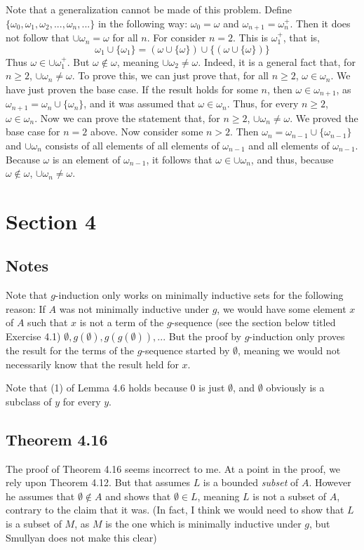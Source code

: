 \documentclass{article}
\theoremstyle{definition}
\begin{document}
Note that a generalization cannot be made of this problem. Define $\{\omega_0,\omega_1,\omega_2,...,\omega_n,...\}$ in the following way: $\omega_0=\omega$ and 
$\omega_{n+1}=\omega_n^+$. Then it does not follow that $\cup\omega_n=\omega$ for all $n$. For consider $n=2$. This is $\omega_1^+$, that is, 
\[ \omega_1\cup\{\omega_1\}=(\omega\cup\{\omega\})\cup\{(\omega\cup\{\omega\})\} \] Thus $\omega\in\cup\omega_1^+$. But $\omega\notin\omega$, meaning 
$\cup\omega_2\ne\omega$. Indeed, it is a general fact that, for $n\ge 2$, $\cup\omega_n\ne\omega$. To prove this, we can just prove that, for all $n\ge 2$, 
$\omega\in\omega_n$. We have just proven the base case. If the result holds for some $n$, then $\omega\in\omega_{n+1}$, as $\omega_{n+1}=\omega_n \cup\{\omega_n\}$, and it was assumed that 
$\omega\in\omega_n$. Thus, for every $n\ge 2$, $\omega\in\omega_n$. Now we can prove the statement that, for $n\ge 2$, $\cup\omega_n\ne\omega$. We proved the base case for $n=2$ above. 
Now consider some $n>2$. Then $\omega_n=\omega_{n-1}\cup\{\omega_{n-1}\}$ and $\cup\omega_n$ consists of all elements of all elements of $\omega_{n-1}$ and 
all elements of $\omega_{n-1}$. Because $\omega$ is an element of $\omega_{n-1}$, it follows that $\omega\in\cup\omega_n$, and thus, because $\omega\notin\omega$, 
$\cup\omega_n\ne\omega$. 

\section*{Section 4}
\subsection*{Notes}
Note that $g$-induction only works on minimally inductive sets for the following reason: If $A$ was not minimally inductive under $g$, we would have some element $x$ of 
$A$ such that $x$ is not a term of the $g$-sequence (see the section below titled Exercise 4.1) $\emptyset,g(\emptyset),g(g(\emptyset)),...$ But the proof by $g$-induction 
only proves the result for the terms of the $g$-sequence started by $\emptyset$, meaning we would not necessarily know that the result held for $x$.


Note that (1) of Lemma 4.6 holds because $0$ is just $\emptyset$, and $\emptyset$ obviously is a subclass of $y$ for every $y$.


\subsection*{Theorem 4.16}
The proof of Theorem 4.16 seems incorrect to me. At a point in the proof, we rely upon Theorem 4.12. But that assumes $L$ is a bounded \textit{subset} of $A$. However he 
assumes that $\emptyset\notin A$ and shows that $\emptyset\in L$, meaning $L$ is not a subset of $A$, contrary to the claim that it was. (In fact, I think we would need 
to show that $L$ is a subset of $M$, as $M$ is the one which is minimally inductive under $g$, but Smullyan does not make this clear)
\end{document}
